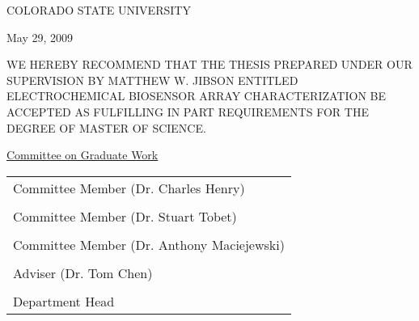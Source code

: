\begin{center}
	COLORADO STATE UNIVERSITY
\end{center}

\vspace{0.5in}

\begin{flushright}
	May 29, 2009
\end{flushright}

WE HEREBY RECOMMEND THAT THE THESIS PREPARED UNDER OUR SUPERVISION BY MATTHEW W. JIBSON ENTITLED ELECTROCHEMICAL BIOSENSOR ARRAY CHARACTERIZATION BE ACCEPTED AS FULFILLING IN PART REQUIREMENTS FOR THE DEGREE OF MASTER OF SCIENCE.

\vspace{0.5in}

\begin{center}
	\underline{Committee on Graduate Work}\\

	\vspace{0.5in}

	\begin{tabular}{p{3in}}
		\\
		\hline Committee Member (Dr. Charles Henry)\\
		\\
		\hline Committee Member (Dr. Stuart Tobet)\\
		\\
		\hline Committee Member (Dr. Anthony Maciejewski)\\
		\\
		\hline Adviser (Dr. Tom Chen)\\
		\\
		\hline Department Head
	\end{tabular}
\end{center}
